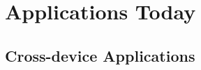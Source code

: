 \chapter{Applications Today}
\label{chp:Applications Today} 




\section{Cross-device Applications}\label{sec:Cross-device Applications}

